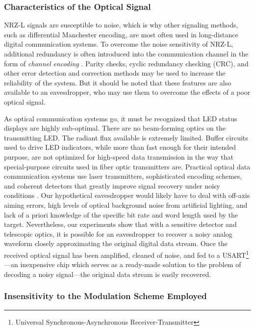 \documentclass{acmtrans2e}
\begin{document}
\subsubsection{Characteristics of the Optical Signal}

NRZ-L signals are susceptible to 
noise, which is why other signaling methods, such as differential 
Manchester encoding, are most often used in long-distance digital 
communication systems.  To overcome the noise sensitivity of NRZ-L, 
additional redundancy is often introduced into the communication channel 
in the form of {\it channel encoding} \cite{proakis}.  Parity checks, 
cyclic redundancy checking (CRC), and other error detection and 
correction methods may be used to increase the reliability of the 
system.  But it should be noted that these features are also available 
to an eavesdropper, who may use them to overcome the effects of a poor 
optical signal.

As optical communication systems go, it must be recognized that LED
status displays are highly sub-optimal.  There are no beam-forming
optics on the transmitting LED.  The radiant flux available is
extremely limited.  Buffer circuits used to drive LED indicators, while 
more than fast enough for their intended purpose, are not optimized for 
high-speed data transmission in the way that special-purpose circuits 
used in fiber optic transmitters are.  Practical optical data 
communication systems use laser transmitters, sophisticated encoding 
schemes, and coherent detectors that greatly improve signal recovery 
under noisy conditions \cite{gagliardi}.  Our hypothetical eavesdropper 
would likely have to deal with off-axis aiming errors, high levels of 
optical background noise from artificial lighting, and lack of a
priori knowledge of the specific bit rate and word length used by the target.  
Nevertheless, our experiments show that with a sensitive detector and 
telescopic optics, it is possible for an eavesdropper to recover a noisy 
analog waveform closely approximating the original digital data stream.  
Once the received optical signal has been amplified, cleaned of noise, 
and fed to a USART\footnote{Universal Synchronous-Asynchronous
Receiver-Transmitter}---an inexpensive chip which serves as a ready-made
solution to the problem of decoding a noisy signal---the original data
stream is easily recovered.

\subsubsection{Insensitivity to the Modulation Scheme Employed}
\end{document}
